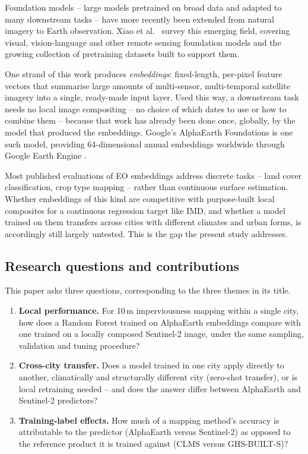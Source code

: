 \documentclass[11pt,a4paper]{article}
\begin{document}
Foundation models -- large models pretrained on broad data and adapted to
many downstream tasks -- have more recently been extended from natural
imagery to Earth observation. Xiao et al.\ \citep{xiao2024fmsurvey} survey
this emerging field, covering visual, vision-language and other remote
sensing foundation models and the growing collection of pretraining datasets
built to support them.

One strand of this work produces \emph{embeddings}: fixed-length, per-pixel
feature vectors that summarise large amounts of multi-sensor, multi-temporal
satellite imagery into a single, ready-made input layer. Used this way, a
downstream task needs no local image compositing -- no choice of which
dates to use or how to combine them -- because that work has already been
done once, globally, by the model that produced the embeddings. Google's
AlphaEarth Foundations \citep{brown2025alphaearth} is one such model,
providing 64-dimensional annual embeddings worldwide through Google Earth
Engine \citep{gorelick2017gee}.

Most published evaluations of EO embeddings address discrete tasks -- land
cover classification, crop type mapping -- rather than continuous surface
estimation. Whether embeddings of this kind are competitive with purpose-built
local composites for a continuous regression target like IMD, and whether
a model trained on them transfers across cities with different climates and
urban forms, is accordingly still largely untested. This is the gap the
present study addresses.

\subsection{Research questions and contributions}
\label{sec:intro-rq}

This paper asks three questions, corresponding to the three themes in its
title.

\begin{enumerate}
  \item \textbf{Local performance.} For 10\,m imperviousness mapping within a
        single city, how does a Random Forest trained on AlphaEarth
        embeddings compare with one trained on a locally composed
        Sentinel-2 image, under the same sampling, validation and tuning
        procedure?
  \item \textbf{Cross-city transfer.} Does a model trained in one city apply
        directly to another, climatically and structurally different city
        (zero-shot transfer), or is local retraining needed -- and does the
        answer differ between AlphaEarth and Sentinel-2 predictors?
  \item \textbf{Training-label effects.} How much of a mapping method's
        accuracy is attributable to the predictor (AlphaEarth versus
        Sentinel-2) as opposed to the reference product it is trained
        against (CLMS versus GHS-BUILT-S)?
\end{enumerate}
\end{document}
